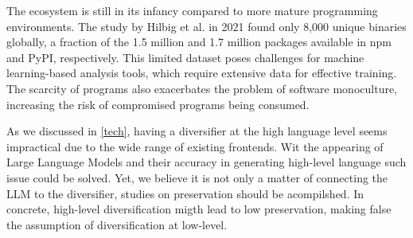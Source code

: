  The \Wasm ecosystem is still in its infancy compared to more mature programming environments. 
The study by Hilbig et al. in 2021 found only 8,000 unique \Wasm binaries globally\cite{Hilbig2021AnES}, a fraction of the 1.5 million and 1.7 million packages available in npm and PyPI, respectively. 
This limited dataset poses challenges for machine learning-based analysis tools, which require extensive data for effective training. 
The scarcity of \Wasm programs also exacerbates the problem of software monoculture, increasing the risk of compromised \Wasm programs being consumed\cite{usenixWasm2020}. 

As we discussed in \autoref{tech}, having a diversifier at the high language level seems impractical due to the wide range of existing frontends.
Wit the appearing of Large Language Models and their accuracy in generating high-level language such issue could be solved.
Yet, we believe it is not only a matter of connecting the LLM to the diversifier, studies on preservation should be acompilshed.
In concrete, high-level diversification migth lead to low preservation, making false the assumption of diversification at low-level.
